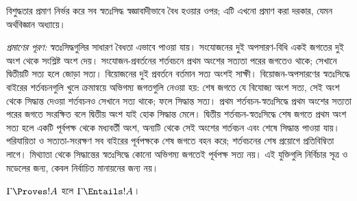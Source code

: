 \documentclass[../../../include/open-logic-section]{subfiles}
\begin{document}


\begin{editorial}
  বিশুদ্ধতার প্রমাণ নির্ভর করে সব স্বতঃসিদ্ধ স্বজ্ঞাবাদীভাবে বৈধ
  হওয়ার ওপর; এটি এখনো প্রমাণ করা দরকার, যেমন অর্থবিজ্ঞান অধ্যায়ে।
\end{editorial}
\emph{প্রমাণের পূরণ:} স্বতঃসিদ্ধগুলির সাধারণ বৈধতা এভাবে পাওয়া যায়। সংযোজনের দুই অপসারণ-বিধি একই জগতের দুই অংশ থেকে সংশ্লিষ্ট অংশ দেয়। সংযোজন-প্রবর্তনের শর্তবচনে প্রথম অংশের সত্যতা পরের জগতেও থাকে; সেখানে দ্বিতীয়টি সত্য হলে জোড়া সত্য। বিয়োজনের দুই প্রবর্তনে বর্তমান সত্য অংশই সাক্ষী। বিয়োজন-অপসারণের স্বতঃসিদ্ধে বাইরের শর্তবচনগুলি খুলে ক্রমান্বয়ে অভিগম্য জগতগুলি নেওয়া হয়: শেষ জগতে যে বিযোজ্য অংশ সত্য, সেই অংশ থেকে সিদ্ধান্ত দেওয়া শর্তবচনও সেখানে সত্য থাকে; ফলে সিদ্ধান্ত সত্য। প্রথম শর্তবচন-স্বতঃসিদ্ধে প্রথম অংশের সত্যতা পরের জগতে সংরক্ষিত বলে দ্বিতীয় অংশ যাই হোক সিদ্ধান্ত মেলে। দ্বিতীয় শর্তবচন-স্বতঃসিদ্ধে শেষ জগতে প্রথম অংশ সত্য হলে একটি পূর্বপক্ষ থেকে মধ্যবর্তী অংশ, অন্যটি থেকে সেই অংশের শর্তবচন এবং শেষে সিদ্ধান্ত পাওয়া যায়। পরিযায়িতা ও সত্যতা-সংরক্ষণ সব বাইরের পূর্বপক্ষকে শেষ জগতে বহন করে; শর্তবচনের শেষ প্রয়োগে প্রতিবিম্বিতা লাগে। মিথ্যাতা থেকে সিদ্ধান্তের স্বতঃসিদ্ধে কোনো অভিগম্য জগতেই পূর্বপক্ষ সত্য নয়। এই যুক্তিগুলি নির্বিচার সূত্র ও মডেলের জন্য, কেবল নির্বাচিত মানায়নের জন্য নয়।

\begin{thm}[বিশুদ্ধতা]
  $\Gamma \Proves !A$ হলে $ \Gamma \Entails !A$।
\end{thm}
\end{document}
